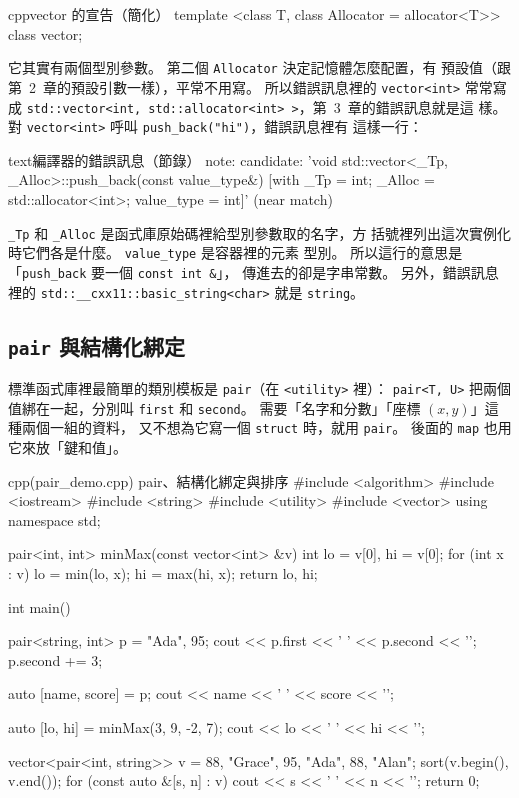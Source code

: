 \begin{code}{cpp}{vector 的宣告（簡化）}
template <class T, class Allocator = allocator<T>>
class vector;
\end{code}

它其實有兩個型別參數。 第二個 \texttt{Allocator} 決定記憶體怎麼配置，有
預設值（跟第~2~章的預設引數一樣），平常不用寫。 所以錯誤訊息裡的 \texttt{vector<int>} 常常寫成
\texttt{std::vector<int, std::allocator<int> >}，第~3~章的錯誤訊息就是這
樣。 對 \texttt{vector<int>} 呼叫 \texttt{push\_back("hi")}，錯誤訊息裡有
這樣一行：

\begin{code}{text}{編譯器的錯誤訊息（節錄）}
note: candidate: 'void std::vector<_Tp, _Alloc>::push_back(const value_type&) [with _Tp = int; _Alloc = std::allocator<int>; value_type = int]' (near match)
\end{code}

\texttt{\_Tp} 和 \texttt{\_Alloc} 是函式庫原始碼裡給型別參數取的名字，方
括號裡列出這次實例化時它們各是什麼。 \texttt{value\_type} 是容器裡的元素
型別。 所以這行的意思是「\texttt{push\_back} 要一個 \texttt{const int \&}」，
傳進去的卻是字串常數。 另外，錯誤訊息裡的 \texttt{std::\_\_cxx11::basic\_string<char>}
就是 \texttt{string}。

\subsection{\texttt{pair} 與結構化綁定}

標準函式庫裡最簡單的類別模板是 \texttt{pair}（在 \texttt{<utility>} 裡）：
\texttt{pair<T, U>} 把兩個值綁在一起，分別叫 \texttt{first} 和
\texttt{second}。 需要「名字和分數」「座標 $(x, y)$」這種兩個一組的資料，
又不想為它寫一個 \texttt{struct} 時，就用 \texttt{pair}。 後面的
\texttt{map} 也用它來放「鍵和值」。

\begin{example}[label=ex:pair]{cpp}{(pair\_demo.cpp) pair、結構化綁定與排序}
#include <algorithm>
#include <iostream>
#include <string>
#include <utility>
#include <vector>
using namespace std;

pair<int, int> minMax(const vector<int> &v) {
    int lo = v[0], hi = v[0];
    for (int x : v) {
        lo = min(lo, x);
        hi = max(hi, x);
    }
    return {lo, hi};
}

int main() {
    pair<string, int> p = {"Ada", 95};
    cout << p.first << ' ' << p.second << '\n';
    p.second += 3;

    auto [name, score] = p;
    cout << name << ' ' << score << '\n';

    auto [lo, hi] = minMax({3, 9, -2, 7});
    cout << lo << ' ' << hi << '\n';

    vector<pair<int, string>> v = {{88, "Grace"}, {95, "Ada"}, {88, "Alan"}};
    sort(v.begin(), v.end());
    for (const auto &[s, n] : v) {
        cout << s << ' ' << n << '\n';
    }
    return 0;
}
\end{example}

